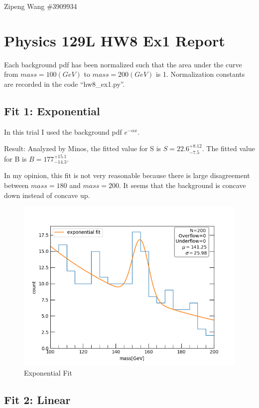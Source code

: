 \documentclass[]{article}
\date{}
\begin{document}
Zipeng Wang \#3909934

\section{Physics 129L HW8 Ex1 Report}\label{physics-129l-hw8-ex1-report}

Each background pdf has been normalized such that the area under the
curve from \(mass = 100(GeV)\) to \(mass = 200(GeV)\) is 1.
Normalization constants are recorded in the code ``hw8\_ex1.py''.

\subsection{Fit 1: Exponential}\label{fit-1-exponential}

In this trial I used the background pdf \(e^{-\alpha x}\).

Result: Analyzed by Minos, the fitted value for S is
\(S = 22.6^{+ 8.12}_{-7.5}\). The fitted value for B is
\(B=177^{+15.1}_{-14.3}\).

In my opinion, this fit is not very reasonable because there is large
disagreement between \(mass = 180\) and \(mass = 200\). It seems that
the background is concave down instead of concave up.

\begin{figure}
\centering
\includegraphics{./ex1_figs/Fit1_exponential.png}
\caption{Exponential Fit}
\end{figure}

\subsection{Fit 2: Linear}\label{fit-2-linear}
\end{document}
